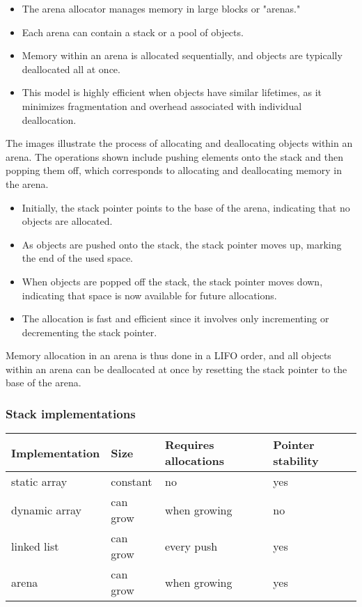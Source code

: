 \documentclass[12pt]{article}
\begin{document}
\begin{itemize}
    \item The arena allocator manages memory in large blocks or "arenas." 
    \item Each arena can contain a stack or a pool of objects.
    \item Memory within an arena is allocated sequentially, and objects are typically deallocated all at once.
    \item This model is highly efficient when objects have similar lifetimes, as it minimizes fragmentation and overhead associated with individual deallocation.
\end{itemize}

The images illustrate the process of allocating and deallocating objects within an arena. The operations shown include pushing elements onto the stack and then popping them off, which corresponds to allocating and deallocating memory in the arena.

\begin{itemize}
    \item Initially, the stack pointer points to the base of the arena, indicating that no objects are allocated.
    \item As objects are pushed onto the stack, the stack pointer moves up, marking the end of the used space.
    \item When objects are popped off the stack, the stack pointer moves down, indicating that space is now available for future allocations.
    \item The allocation is fast and efficient since it involves only incrementing or decrementing the stack pointer.
\end{itemize}

Memory allocation in an arena is thus done in a LIFO order, and all objects within an arena can be deallocated at once by resetting the stack pointer to the base of the arena.

\subsubsection{Stack implementations}

\begin{tabular}{|l|l|l|l|}
\hline
\textbf{Implementation} & \textbf{Size} & \textbf{Requires allocations} & \textbf{Pointer stability} \\
\hline
static array & constant & no & yes \\
\hline
dynamic array & can grow & when growing & no \\
\hline
linked list & can grow & every push & yes \\
\hline
arena & can grow & when growing & yes \\
\hline
\end{tabular}
\end{document}

